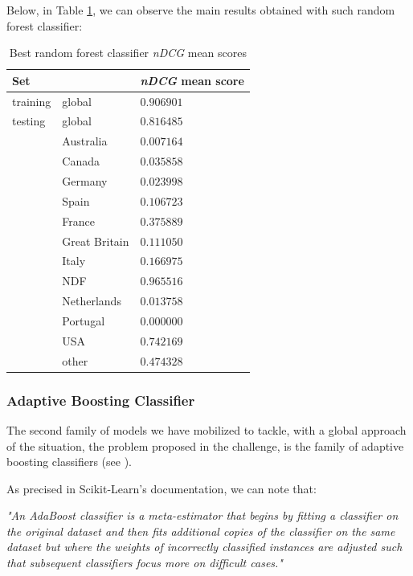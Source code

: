 \documentclass[twocolumn, switch]{article}
\begin{document}
Below, in Table \ref{tab:rfc}, we can observe the main results obtained with such random forest classifier:

\begin{table}[H]
\caption{Best random forest classifier \textit{nDCG} mean scores}
\centering
\begin{tabular}{lll}
\toprule
Set & & \textit{nDCG} mean score \\
\midrule
training & global & $0.906901$ \\
testing & global & $0.816485$ \\
& Australia & $0.007164$ \\
& Canada & $0.035858$ \\
& Germany & $0.023998$ \\
& Spain & $0.106723$ \\
& France & $0.375889$ \\
& Great Britain & $0.111050$ \\
& Italy & $0.166975$ \\
& NDF & $0.965516$ \\
& Netherlands & $0.013758$ \\
& Portugal & $0.000000$ \\
& USA & $0.742169$ \\
& other & $0.474328$ \\
\bottomrule
\end{tabular}
\label{tab:rfc}
\end{table}

\subsubsection{Adaptive Boosting Classifier}

The second family of models we have mobilized to tackle, with a global approach of the situation, the problem proposed in the challenge, is the family of adaptive boosting classifiers (see \cite{Freund_1997}).

As precised in Scikit-Learn's documentation, we can note that:

\textit{"An AdaBoost classifier is a meta-estimator that begins by fitting a classifier on the original dataset and then fits additional copies of the classifier on the same dataset but where the weights of incorrectly classified instances are adjusted such that subsequent classifiers focus more on difficult cases."}
\end{document}
